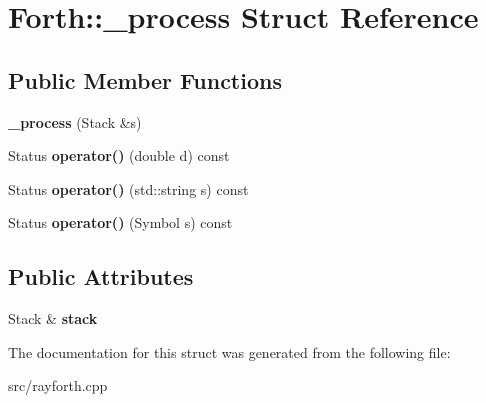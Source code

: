 \hypertarget{struct_forth_1_1__process}{\section{Forth\-:\-:\-\_\-process Struct Reference}
\label{struct_forth_1_1__process}
}
\subsection*{Public Member Functions}
\begin{DoxyCompactItemize}
\item 
\hypertarget{struct_forth_1_1__process_a3ccbc07c87e8b5b282c01d613a7625c6}{{\bfseries \-\_\-process} (Stack \&s)}\label{struct_forth_1_1__process_a3ccbc07c87e8b5b282c01d613a7625c6}

\item 
\hypertarget{struct_forth_1_1__process_a05767c499f7b4e8c5548032b578aa0ba}{Status {\bfseries operator()} (double d) const }\label{struct_forth_1_1__process_a05767c499f7b4e8c5548032b578aa0ba}

\item 
\hypertarget{struct_forth_1_1__process_af8da5dfa0a42a9253116dabcbf187b29}{Status {\bfseries operator()} (std\-::string s) const }\label{struct_forth_1_1__process_af8da5dfa0a42a9253116dabcbf187b29}

\item 
\hypertarget{struct_forth_1_1__process_a18a7d34a8ba97596b0e38c5645ff345d}{Status {\bfseries operator()} (Symbol s) const }\label{struct_forth_1_1__process_a18a7d34a8ba97596b0e38c5645ff345d}

\end{DoxyCompactItemize}
\subsection*{Public Attributes}
\begin{DoxyCompactItemize}
\item 
\hypertarget{struct_forth_1_1__process_a29f243fcd2bdd8e6c8aa90a55f79355b}{Stack \& {\bfseries stack}}\label{struct_forth_1_1__process_a29f243fcd2bdd8e6c8aa90a55f79355b}

\end{DoxyCompactItemize}


The documentation for this struct was generated from the following file\-:\begin{DoxyCompactItemize}
\item 
src/rayforth.\-cpp\end{DoxyCompactItemize}
